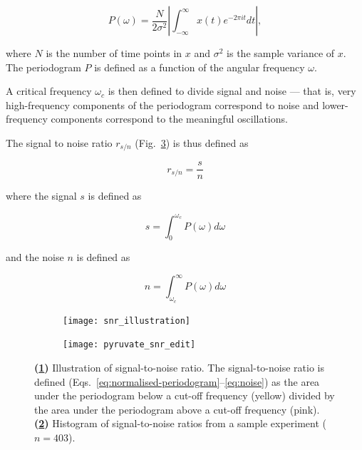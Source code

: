 \begin{equation}
  P(\omega) = \frac{N}{2\sigma^{2}} \left|\int_{-\infty}^{\infty} x(t) e^{-2\pi it}dt \right|, %
  \label{eq:normalised-periodogram}
\end{equation}

where $N$ is the number of time points in $x$ and $\sigma^{2}$ is the sample variance of $x$.
The periodogram $P$ is defined as a function of the angular frequency $\omega$.

A critical frequency $\omega_{c}$ is then defined to divide signal and noise --- that is, very high-frequency components of the periodogram correspond to noise and lower-frequency components correspond to the meaningful oscillations.

\pagebreak

The signal to noise ratio $r_{s/n}$ (Fig.\ \ref{fig:analysis-snr}) is thus defined as

\begin{equation}
  r_{s/n} = \frac{s}{n}
  \label{eq:snr}
\end{equation}

where the signal $s$ is defined as

\begin{equation}
  s = \int_{0}^{\omega_{c}} P(\omega) d\omega
  \label{eq:signal}
\end{equation}

and the noise $n$ is defined as

\begin{equation}
  n = \int_{\omega_{c}}^{\infty} P(\omega) d\omega
  \label{eq:noise}
\end{equation}


\begin{figure}[hb!]
  \centering
  \begin{subfigure}[htpb]{0.5\textwidth}
   \centering
   \texttt{[image: snr\_illustration]}
   \caption{
   }
   \label{fig:analysis-snr-illustration}
 \end{subfigure}%
 \begin{subfigure}[htpb]{0.5\textwidth}
   \centering
   \texttt{[image: pyruvate\_snr\_edit]}
   \caption{
   }
   \label{fig:analysis-snr-histogram-example}
  \end{subfigure}

  \caption[
    Illustration of signal-to-noise ratio.
  ]{
    \textbf{(\ref{fig:analysis-snr-illustration})}
    Illustration of signal-to-noise ratio.
    The signal-to-noise ratio is defined (Eqs.\ \ref{eq:normalised-periodogram}--\ref{eq:noise}) as the area under the periodogram below a cut-off frequency (yellow) divided by the area under the periodogram above a cut-off frequency (pink).
    \textbf{(\ref{fig:analysis-snr-histogram-example})}
    Histogram of signal-to-noise ratios from a sample experiment ($n=403$).
  }
  \label{fig:analysis-snr}
\end{figure}

